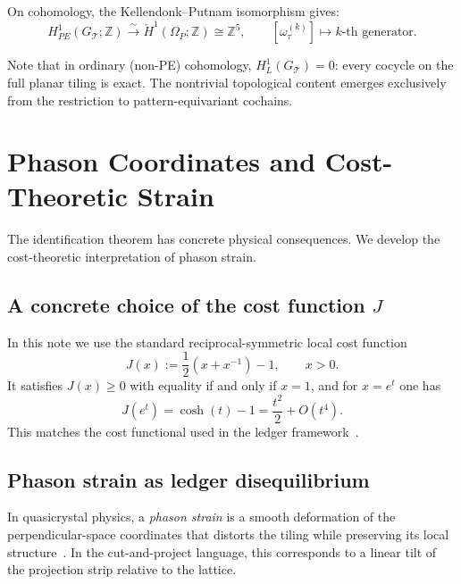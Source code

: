 \documentclass[12pt]{article}
\theoremstyle{definition}
\theoremstyle{remark}
\newcommand{\ZZ}{\mathbb{Z}}
\newcommand{\Hcech}{\check{H}}
\begin{document}
On cohomology, the Kellendonk--Putnam isomorphism gives:
\begin{equation}
H^1_{PE}(G_{\mathcal{T}}; \ZZ) \xrightarrow{\;\sim\;} \Hcech^1(\Omega_P; \ZZ) \cong \ZZ^5, \qquad [\omega_\tau^{(k)}] \longmapsto \text{$k$-th generator}.
\label{eq:cohomology-chain}
\end{equation}

Note that in ordinary (non-PE) cohomology, $H^1_L(G_{\mathcal{T}}) = 0$: every cocycle on the full planar tiling is exact. The nontrivial topological content emerges exclusively from the restriction to pattern-equivariant cochains.

\section{Phason Coordinates and Cost-Theoretic Strain}
\label{sec:phason}

The identification theorem has concrete physical consequences. We develop the cost-theoretic interpretation of phason strain.

\subsection{A concrete choice of the cost function $J$}
\label{subsec:J}

In this note we use the standard reciprocal-symmetric local cost function
\begin{equation}
J(x) := \frac{1}{2}\left(x + x^{-1}\right) - 1, \qquad x>0.
\label{eq:J-def}
\end{equation}
It satisfies $J(x)\ge 0$ with equality if and only if $x=1$, and for $x=e^t$ one has
\begin{equation}
J(e^t) = \cosh(t)-1 = \frac{t^2}{2} + O(t^4).
\label{eq:J-cosh}
\end{equation}
This matches the cost functional used in the ledger framework~\cite{PardoGuerraEtAl2026}.

\subsection{Phason strain as ledger disequilibrium}

In quasicrystal physics, a \emph{phason strain} is a smooth deformation of the perpendicular-space coordinates that distorts the tiling while preserving its local structure~\cite{Levine1985,Socolar1986}. In the cut-and-project language, this corresponds to a linear tilt of the projection strip relative to the lattice.
\end{document}
